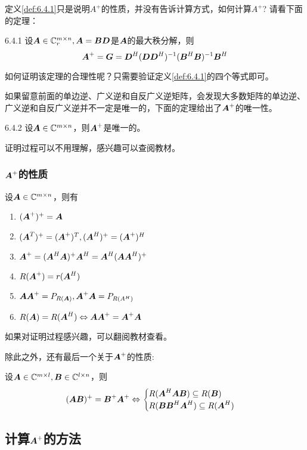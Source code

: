 \documentclass[12pt, a4paper, oneside, UTF8]{ctexbook}
\begin{document}
定义\ref{def:6.4.1}只是说明$A^+$的性质，并没有告诉计算方式，如何计算$A^+$? 请看下面的定理：
\begin{them}{}{6.4.1}
    设$\A\in\C_r^{m\times n}, \A=\B\D$是$\A$的最大秩分解，则\[\A^+=\G=\D^H(\D\D^H)^{-1}(\B^H\B)^{-1}\B^H\]
\end{them}
如何证明该定理的合理性呢？只需要验证定义\ref{def:6.4.1}的四个等式即可。

如果留意前面的单边逆、广义逆和自反广义逆矩阵，会发现大多数矩阵的单边逆、广义逆和自反广义逆并不一定是唯一的，下面的定理给出了$\A^+$的唯一性。
\begin{them}{}{6.4.2}
    设$\A\in\C^{m\times n}$，则$\A^+$是唯一的。
\end{them}

证明过程可以不用理解，感兴趣可以查阅教材。

\subsubsection{$\A^+$的性质}
\begin{them}{}{}
    设$\A\in\C^{m\times n}$，则有
    \begin{enumerate}
        \item $(\A^+)^+=\A$
        \item $(\A^T)^+=(\A^+)^T, (\A^H)^+=(\A^+)^H$
        \item $\A^+=(\A^H\A)^+\A^H=\A^H(\A\A^H)^+$
        \item $R(\A^+)=r(\A^H)$
        \item $\A\A^+=P_{R(\A)}, \A^+\A=P_{R(A^H)}$
        \item $R(\A)=R(\A^H)\Leftrightarrow \A\A^+=\A^+\A$
    \end{enumerate}
\end{them}

如果对证明过程感兴趣，可以翻阅教材查看。

除此之外，还有最后一个关于$\A^+$的性质:
\begin{them}{}{}
    设$\A\in\C^{m\times l}, \B\in\C^{l\times n}$，则\[(\A\B)^+=\B^+\A^+\Leftrightarrow\begin{cases}R(\A^H\A\B)\subseteq R(\B)\\R(\B\B^H\A^H)\subseteq 
     R(\A^H)\end{cases}\]
\end{them}

\subsection{计算$\A^+$的方法}
\end{document}
